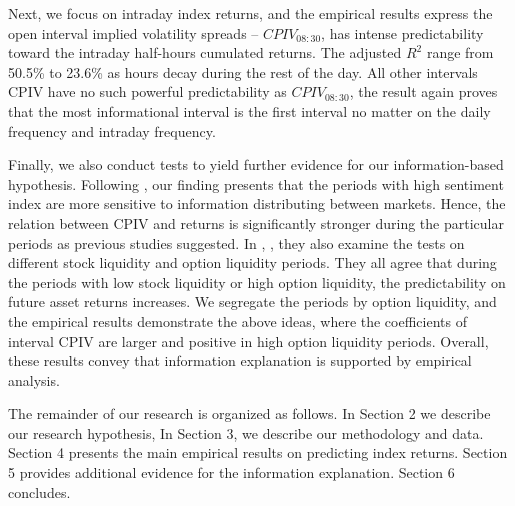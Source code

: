 Next, we focus on intraday index returns, and the empirical results express the open interval implied volatility spreads -- $CPIV_{08:30}$, has intense predictability toward the intraday half-hours cumulated returns. The adjusted $R^{2}$ range from 50.5\% to 23.6\% as hours decay during the rest of the day. All other intervals CPIV have no such powerful predictability as $CPIV_{08:30}$, the result again proves that the most informational interval is the first interval no matter on the daily frequency and intraday frequency.     

Finally, we also conduct tests to yield further evidence for our information-based hypothesis. Following \textcite{atilgan2015implied}, our finding presents that the periods with high sentiment index are more sensitive to information distributing between markets. Hence, the relation between CPIV and returns is significantly stronger during the particular periods as previous studies suggested. In \textcite{pan2006information}, \textcite{chang2018implied}, they also examine the tests on different stock liquidity and option liquidity periods. They all agree that during the periods with low stock liquidity or high option liquidity, the predictability on future asset returns increases. We segregate the periods by option liquidity, and the empirical results demonstrate the above ideas, where the coefficients of interval CPIV are larger and positive in high option liquidity periods. Overall, these results convey that information explanation is supported by empirical analysis. 

The remainder of our research is organized as follows. In Section 2 we describe our research hypothesis, In Section 3, we describe our methodology and data. Section 4 presents the main empirical results on predicting index returns. Section 5 provides additional evidence for the information explanation. Section 6 concludes. 